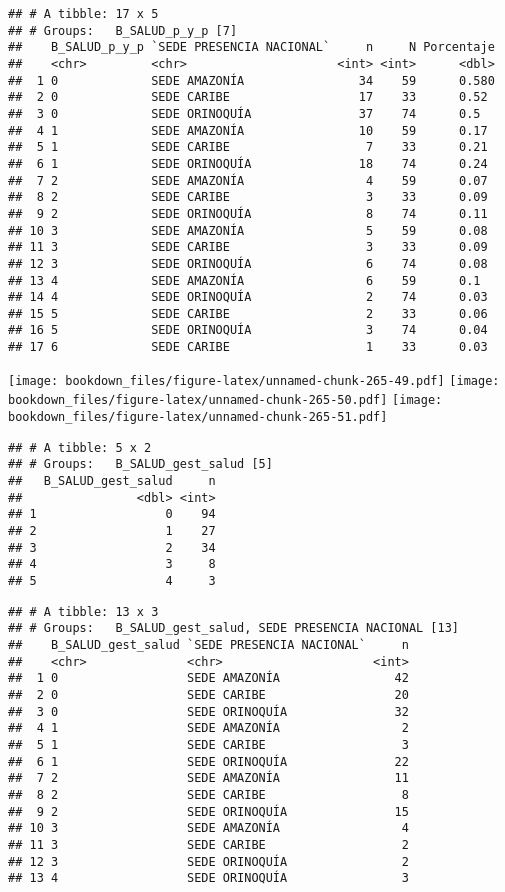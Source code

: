 \documentclass[]{article}
\theoremstyle{definition}
\theoremstyle{definition}
\theoremstyle{definition}
\theoremstyle{remark}
\begin{document}
\begin{verbatim}
## # A tibble: 17 x 5
## # Groups:   B_SALUD_p_y_p [7]
##    B_SALUD_p_y_p `SEDE PRESENCIA NACIONAL`     n     N Porcentaje
##    <chr>         <chr>                     <int> <int>      <dbl>
##  1 0             SEDE AMAZONÍA                34    59      0.580
##  2 0             SEDE CARIBE                  17    33      0.52 
##  3 0             SEDE ORINOQUÍA               37    74      0.5  
##  4 1             SEDE AMAZONÍA                10    59      0.17 
##  5 1             SEDE CARIBE                   7    33      0.21 
##  6 1             SEDE ORINOQUÍA               18    74      0.24 
##  7 2             SEDE AMAZONÍA                 4    59      0.07 
##  8 2             SEDE CARIBE                   3    33      0.09 
##  9 2             SEDE ORINOQUÍA                8    74      0.11 
## 10 3             SEDE AMAZONÍA                 5    59      0.08 
## 11 3             SEDE CARIBE                   3    33      0.09 
## 12 3             SEDE ORINOQUÍA                6    74      0.08 
## 13 4             SEDE AMAZONÍA                 6    59      0.1  
## 14 4             SEDE ORINOQUÍA                2    74      0.03 
## 15 5             SEDE CARIBE                   2    33      0.06 
## 16 5             SEDE ORINOQUÍA                3    74      0.04 
## 17 6             SEDE CARIBE                   1    33      0.03
\end{verbatim}

\texttt{[image: bookdown\_files/figure-latex/unnamed-chunk-265-49.pdf]}
\texttt{[image: bookdown\_files/figure-latex/unnamed-chunk-265-50.pdf]}
\texttt{[image: bookdown\_files/figure-latex/unnamed-chunk-265-51.pdf]}

\begin{verbatim}
## # A tibble: 5 x 2
## # Groups:   B_SALUD_gest_salud [5]
##   B_SALUD_gest_salud     n
##                <dbl> <int>
## 1                  0    94
## 2                  1    27
## 3                  2    34
## 4                  3     8
## 5                  4     3
\end{verbatim}

\begin{verbatim}
## # A tibble: 13 x 3
## # Groups:   B_SALUD_gest_salud, SEDE PRESENCIA NACIONAL [13]
##    B_SALUD_gest_salud `SEDE PRESENCIA NACIONAL`     n
##    <chr>              <chr>                     <int>
##  1 0                  SEDE AMAZONÍA                42
##  2 0                  SEDE CARIBE                  20
##  3 0                  SEDE ORINOQUÍA               32
##  4 1                  SEDE AMAZONÍA                 2
##  5 1                  SEDE CARIBE                   3
##  6 1                  SEDE ORINOQUÍA               22
##  7 2                  SEDE AMAZONÍA                11
##  8 2                  SEDE CARIBE                   8
##  9 2                  SEDE ORINOQUÍA               15
## 10 3                  SEDE AMAZONÍA                 4
## 11 3                  SEDE CARIBE                   2
## 12 3                  SEDE ORINOQUÍA                2
## 13 4                  SEDE ORINOQUÍA                3
\end{verbatim}
\end{document}
